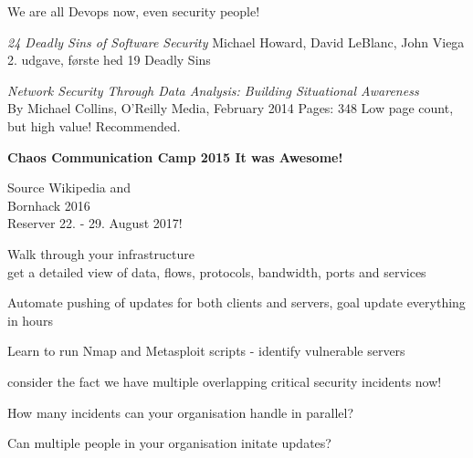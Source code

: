 \documentclass[20pt,landscape,a4paper,footrule]{foils}
\begin{document}
\centerline{We are all Devops now, even security people!}




\begin{list1}


\item \emph{24 Deadly Sins of Software Security}
Michael Howard, David LeBlanc, John Viega 2. udgave, første hed 19 Deadly Sins

\item \emph{Network Security Through Data Analysis: Building Situational Awareness}\\
By Michael Collins, O'Reilly Media, February 2014 Pages: 348
Low page count, but high value! Recommended.
\end{list1}



\centerline{\bf Chaos Communication Camp 2015 It was Awesome!}

{\small Source Wikipedia and }\\
Bornhack 2016 \\
Reserver 22. - 29. August 2017! 




\begin{list2}
\item Walk through your infrastructure\\
get a detailed view of data, flows, protocols, bandwidth, ports and services

\item Automate pushing of updates for both clients and servers, goal update everything in hours
\item Learn to run Nmap and Metasploit scripts - identify vulnerable servers
\end{list2}

\vskip 2cm
\centerline{consider the fact we have multiple overlapping critical security incidents now!}

\vskip 2cm
How many incidents can your organisation handle in parallel?

Can multiple people in your organisation initate updates?


\myquestionspage
\end{document}
